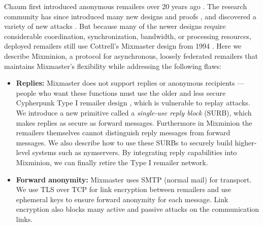 \documentclass[final]{ieee}
\begin{document}
Chaum first introduced anonymous remailers over 20 years ago
\cite{chaum-mix}.
The research community has since introduced many new
designs and proofs
\cite{abe}\cite{babel}\cite{flash-mix}\cite{kesdogan}\cite{shuffle}\cite{hybrid-mix}, 
and discovered a variety of new attacks 
\cite{back01}\cite{langos02}\cite{disad-free-routes}\cite{desmedt}\cite{mitkuro}\cite{raymond00}.
But because many of the newer designs require considerable coordination,
synchronization, bandwidth, or processing resources, deployed remailers still use
Cottrell's Mixmaster design from 1994
\cite{mixmaster-attacks}\cite{mixmaster-spec}. Here we describe Mixminion, a
protocol for asynchronous, loosely federated remailers that maintains
Mixmaster's flexibility while addressing the following flaws:

\begin{itemize}
\item \textbf{Replies:} Mixmaster does not support replies or anonymous
recipients --- people who want these functions must use the older and less
secure Cypherpunk Type I remailer design \cite{remailer-history}, which is
vulnerable to replay attacks. We introduce a new primitive called a
\emph{single-use reply block} (SURB), which makes replies as secure as
forward messages. Furthermore in Mixminion the remailers
themselves cannot distinguish reply messages from forward messages. We also
describe how to use these SURBs to securely build higher-level systems such as
nymservers. By integrating reply capabilities into Mixminion, we can finally
retire the Type I remailer network.

\item \textbf{Forward anonymity:} Mixmaster uses SMTP (normal mail) for
transport. We use TLS over TCP for link encryption between remailers
and use ephemeral keys to ensure forward anonymity for
each message. Link encryption also blocks many active and
passive attacks on the communication links.



\end{itemize}
\end{document}
